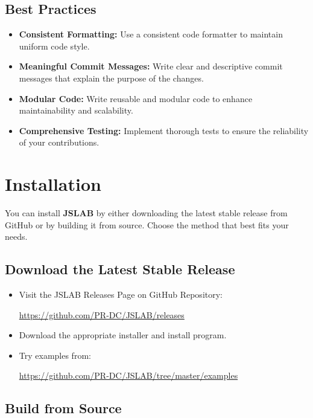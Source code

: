 \documentclass[12pt,a4paper]{article}
\begin{document}
\subsection{Best Practices}
\begin{itemize}
  \item \textbf{Consistent Formatting:} Use a consistent code formatter to maintain uniform code style.
  
  \item \textbf{Meaningful Commit Messages:} Write clear and descriptive commit messages that explain the purpose of the changes.
  
  \item \textbf{Modular Code:} Write reusable and modular code to enhance maintainability and scalability.
  
  \item \textbf{Comprehensive Testing:} Implement thorough tests to ensure the reliability of your contributions.
\end{itemize}

\section{Installation}

You can install \textbf{JSLAB} by either downloading the latest stable release from GitHub or by building it from source. Choose the method that best fits your needs.

\subsection{Download the Latest Stable Release}
\begin{itemize}
  \item Visit the JSLAB Releases Page on GitHub Repository: 
  
  \url{https://github.com/PR-DC/JSLAB/releases} 
  
  \item Download the appropriate installer and install program.

  \item Try examples from:

  \url{https://github.com/PR-DC/JSLAB/tree/master/examples}

\end{itemize}

\subsection{Build from Source}
\end{document}
